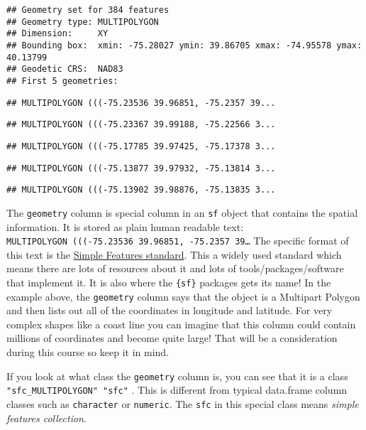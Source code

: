 \documentclass[
]{article}
\begin{document}
\begin{verbatim}
## Geometry set for 384 features 
## Geometry type: MULTIPOLYGON
## Dimension:     XY
## Bounding box:  xmin: -75.28027 ymin: 39.86705 xmax: -74.95578 ymax: 40.13799
## Geodetic CRS:  NAD83
## First 5 geometries:
\end{verbatim}

\begin{verbatim}
## MULTIPOLYGON (((-75.23536 39.96851, -75.2357 39...
\end{verbatim}

\begin{verbatim}
## MULTIPOLYGON (((-75.23367 39.99188, -75.22566 3...
\end{verbatim}

\begin{verbatim}
## MULTIPOLYGON (((-75.17785 39.97425, -75.17378 3...
\end{verbatim}

\begin{verbatim}
## MULTIPOLYGON (((-75.13877 39.97932, -75.13814 3...
\end{verbatim}

\begin{verbatim}
## MULTIPOLYGON (((-75.13902 39.98876, -75.13835 3...
\end{verbatim}

The \texttt{geometry} column is special column in an \texttt{sf} object
that contains the spatial information. It is stored as plain human
readable text:
\texttt{MULTIPOLYGON\ (((-75.23536\ 39.96851,\ -75.2357\ 39\ldots{}} The
specific format of this text is the
\href{https://r-spatial.github.io/sf/articles/sf1.html}{Simple Features
standard}. This a widely used standard which means there are lots of
resources about it and lots of tools/packages/software that implement
it. It is also where the \texttt{\{sf\}} packages gets its name! In the
example above, the \texttt{geometry} column says that the object is a
Multipart Polygon and then lists out all of the coordinates in longitude
and latitude. For very complex shapes like a coast line you can imagine
that this column could contain millions of coordinates and become quite
large! That will be a consideration during this course so keep it in
mind.

If you look at what class the \texttt{geometry} column is, you can see
that it is a class \texttt{"sfc\_MULTIPOLYGON"\ "sfc"} . This is
different from typical data.frame column classes such as
\texttt{character} or \texttt{numeric}. The \texttt{sfc} in this special
class means \emph{simple features collection}.
\end{document}
